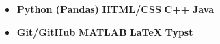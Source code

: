 

\newcommand{\skillitem}[1]{%
    \textbf{\underline{#1}}%
    \quad
}

\newenvironment{skills}{%
    \raggedright%
    \begin{itemize}[label={}, leftmargin=*]%
}{%
    \end{itemize}%
}

\begin{skills}
    \item \skillitem{Python (Pandas)} \skillitem{HTML/CSS} \skillitem{C++} \skillitem{Java}
\end{skills}%

\divider

\begin{skills}
    \item \skillitem{Git/GitHub} \skillitem{MATLAB} \skillitem{LaTeX} \skillitem{Typst}
\end{skills}